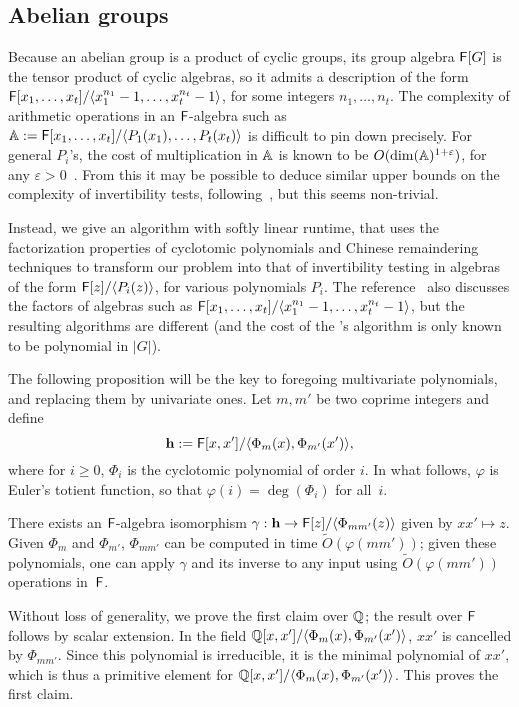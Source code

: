 
\subsection{Abelian groups}

Because an abelian group is a product of cyclic groups, its group
algebra ${\mathsf{F}}[G]$ is the tensor product of cyclic algebras, so it admits
a description of the form ${\mathsf{F}}[x_1,\dots,x_t]/\langle
x_1^{n_1}-1,\dots,x_t^{n_t}-1\rangle$, for some integers
$n_1,\dots,n_t$. The complexity of arithmetic operations in an
${\mathsf{F}}$-algebra such as $\mathbb{A}:={\mathsf{F}}[x_1,\dots,x_t]/\langle
P_1(x_1),\dots,P_t(x_t)\rangle$ is difficult to pin down
precisely. For general $P_i$'s, the cost of multiplication in $\mathbb{A}$ is
known to be $O(\dim(\mathbb{A})^{1+\varepsilon})$, for any $\varepsilon >
0$~\cite[Theorem~2]{LiMoSc09}. From this it may be possible to deduce
similar upper bounds on the complexity of invertibility tests,
following~\cite{DaMMMScXi06}, but this seems non-trivial.

Instead, we give an algorithm with softly linear runtime, that uses
the factorization properties of cyclotomic polynomials and Chinese
remaindering techniques to transform our problem into that of
invertibility testing in algebras of the form ${\mathsf{F}}[z]/\langle P_i(z)
\rangle$, for various polynomials $P_i$. The reference~\cite{Pol94}
also discusses the factors of algebras such as
${\mathsf{F}}[x_1,\dots,x_t]/\langle x_1^{n_1}-1,\dots,x_t^{n_t}-1\rangle$, but
the resulting algorithms are different (and the cost of the
\citeauthor{Pol94}'s \citeyear{Pol94} algorithm is only known to be
polynomial in $|G|$).

\smallskip

The following proposition will be the key to foregoing multivariate
polynomials, and replacing them by univariate ones.  Let $m,m'$ be two
coprime integers and define
$$\mathbf{h}:={\mathsf{F}}[x,x']/\langle \Phi_{m}(x), \Phi_{m'}(x')\rangle,$$
where for $i \ge 0$, $\Phi_i$ is the cyclotomic polynomial of order
$i$. In what follows, $\varphi$ is Euler's totient function, so that
$\varphi(i) = \deg(\Phi_i)$ for all~$i$.
\begin{lemma}
  There exists an ${\mathsf{F}}$-algebra isomorphism $\gamma: \mathbf{h} \to
  {\mathsf{F}}[z]/\langle\Phi_{mm'}(z)\rangle$ given by $xx' \mapsto z$.  Given
  $\Phi_m$ and $\Phi_{m'}$, $\Phi_{mm'}$ can be computed in time
  $\tilde{O}(\varphi(mm'))$; given these polynomials, one can
  apply $\gamma$ and its inverse to any input using
  $\tilde{O}(\varphi(mm'))$ operations in~${\mathsf{F}}$.
\end{lemma}
  Without loss of generality, we prove the first claim over $\mathbb{Q}$; the
  result over ${\mathsf{F}}$ follows by scalar extension. In the field \sloppy
  $\mathbb{Q}[x,x']/\langle \Phi_{m}(x), \Phi_{m'}(x')\rangle$, $xx'$ is
  cancelled by $\Phi_{mm'}$. Since this polynomial is irreducible, it
  is the minimal polynomial of $xx'$, which is thus a primitive
  element for $\mathbb{Q}[x,x']/\langle \Phi_{m}(x),
  \Phi_{m'}(x')\rangle$. This proves the first claim.

